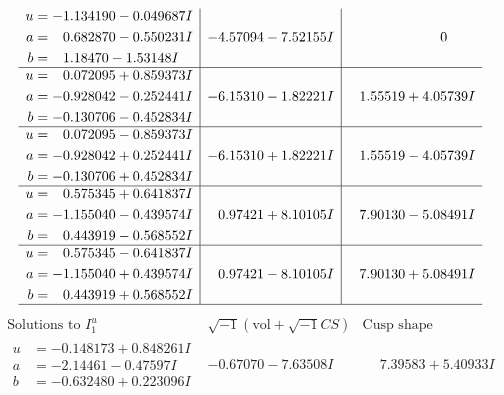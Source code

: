 \documentclass[1p]{elsarticle_modified}
\theoremstyle{definition}
\newcommand{\I}{\sqrt{-1}}
\begin{document}
$$\begin{array}{c|c|c}
\begin{aligned}
u &= -1.134190 - 0.049687 I \\
a &= \phantom{-}0.682870 - 0.550231 I \\
b &= \phantom{-}1.18470 - 1.53148 I\end{aligned}
 & -4.57094 - 7.52155 I & \phantom{-0.000000 } 0 \\ \hline\begin{aligned}
u &= \phantom{-}0.072095 + 0.859373 I \\
a &= -0.928042 - 0.252441 I \\
b &= -0.130706 - 0.452834 I\end{aligned}
 & -6.15310 - 1.82221 I & \phantom{-}1.55519 + 4.05739 I \\ \hline\begin{aligned}
u &= \phantom{-}0.072095 - 0.859373 I \\
a &= -0.928042 + 0.252441 I \\
b &= -0.130706 + 0.452834 I\end{aligned}
 & -6.15310 + 1.82221 I & \phantom{-}1.55519 - 4.05739 I \\ \hline\begin{aligned}
u &= \phantom{-}0.575345 + 0.641837 I \\
a &= -1.155040 - 0.439574 I \\
b &= \phantom{-}0.443919 - 0.568552 I\end{aligned}
 & \phantom{-}0.97421 + 8.10105 I & \phantom{-}7.90130 - 5.08491 I \\ \hline\begin{aligned}
u &= \phantom{-}0.575345 - 0.641837 I \\
a &= -1.155040 + 0.439574 I \\
b &= \phantom{-}0.443919 + 0.568552 I\end{aligned}
 & \phantom{-}0.97421 - 8.10105 I & \phantom{-}7.90130 + 5.08491 I\\
 \hline 
 \end{array}$$\newpage$$\begin{array}{c|c|c}  
\text{Solutions to }I^u_{1}& \I (\text{vol} + \sqrt{-1}CS) & \text{Cusp shape}\\
 \hline 
\begin{aligned}
u &= -0.148173 + 0.848261 I \\
a &= -2.14461 - 0.47597 I \\
b &= -0.632480 + 0.223096 I\end{aligned}
 & -0.67070 - 7.63508 I & \phantom{-}7.39583 + 5.40933 I \\ \hline\begin{aligned}

\end{aligned}
\end{array}$$
\end{document}
